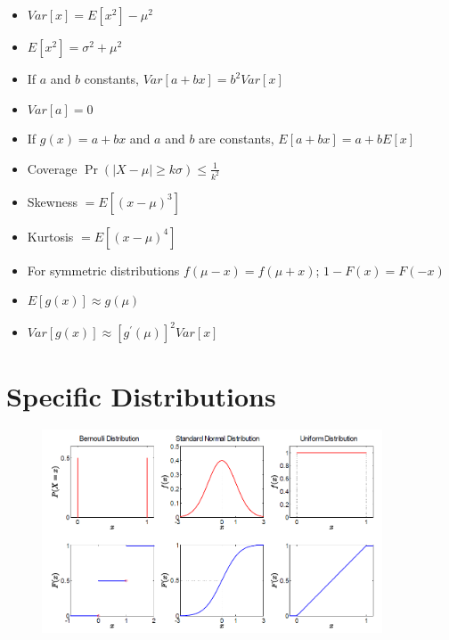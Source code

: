 \documentclass[a4paper,12pt]{article}
\begin{document}
\begin{itemize}
	\item $Var[x] = E[x^{2}] - \mu^{2}$
	\item $E[x^{2}] = \sigma^{2} + \mu^{2}$
	\item If $a$ and $b$ constants, $Var[a + bx] = b^{2} Var[x]$
	\item $Var[a] = 0$
	\item If $g(x) = a + bx$ and $a$ and $b$ are constants, $E[a + bx] = a + bE[x]$
	\item Coverage $\Pr(|X-\mu|\geq k\sigma) \leq \frac{1}{k^2}$
	\item Skewness $= E[(x - \mu)^{3}]$
	\item Kurtosis $= E[(x - \mu)^{4}]$
	\item For symmetric distributions $f(\mu - x) = f(\mu + x)$; $1-F(x)=F(-x)$
	\item $E[g(x)] \approx g(\mu)$
	\item $Var[g(x)]\approx [g^{\prime}(\mu)]^{2} Var[x]$
\end{itemize}

\newpage
\section{Specific Distributions}
\label{ch: Specific Distributions}
\begin{figure}[H]
\centering
{\includegraphics[width=0.9\textwidth]{figures/distributions}}\label{f1}
\end{figure}

\newpage
\end{document}
